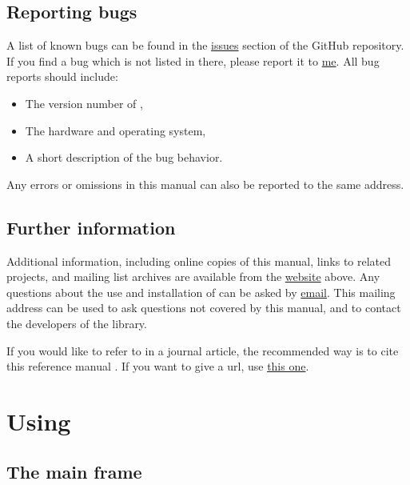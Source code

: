 \documentclass{ol-softwaremanual}
\begin{document}
\subsection{Reporting bugs}

A list of known bugs can be found in the \href{https://github.com/mcastel1/thelemacus/issues}{issues} section of the GitHub repository.
If you find a bug which is not listed in there, please report it to \href{mailto:michele.castellana@gmail.com}{me}. All bug reports should include:
\begin{itemize}
    \item The version number of \thel, 
    \item The hardware and operating system, 
    \item A short description of the bug behavior. 

\end{itemize}

Any errors or omissions in this manual can also be reported to the same address.


\subsection{Further information}


Additional information, including online copies of this manual, links to related projects, and mailing list archives are available from the \href{https://sites.google.com/site/michelecastellana/home}{website}  above.
Any questions about the use and installation of \thel can be asked by \href{mailto:michele.castellana@gmail.com}{email}. This mailing address can be used to ask questions not covered by this manual, and to contact the developers of the library.

If you would like to refer to \thel in a journal article, the recommended way is to cite this reference manual \cite{castellana2024thelemacus-documentation}. If you want to give a url, use  \href{https://sites.google.com/site/michelecastellana/home}{this one}. 



\section{Using \thel}

\subsection{The main frame}
\end{document}
